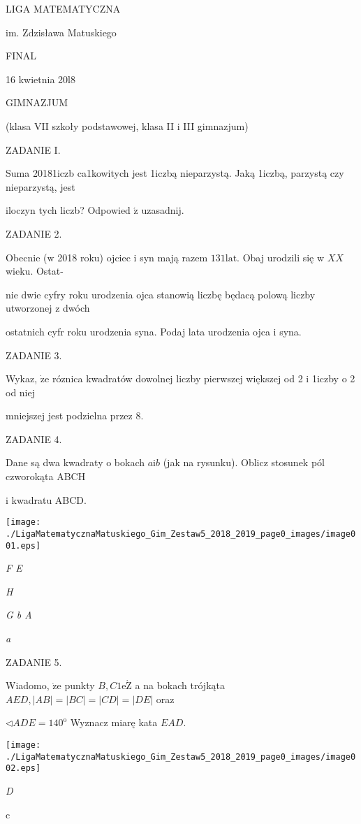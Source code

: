 \documentclass[a4paper,12pt]{article}
\begin{document}
LIGA MATEMATYCZNA

im. Zdzisława Matuskiego

FINAL

16 kwietnia 20l8

GIMNAZJUM

(klasa VII szkoły podstawowej, klasa II i III gimnazjum)

ZADANIE I.

Suma 20181iczb ca1kowitych jest 1iczbą nieparzystą. Jaką 1iczbą, parzystą czy nieparzystą, jest

iloczyn tych liczb? Odpowied $\acute{\mathrm{z}}$ uzasadnij.

ZADANIE 2.

Obecnie ($\mathrm{w}$ 2018 roku) ojciec i syn mają razem $131\mathrm{l}\mathrm{a}\mathrm{t}$. Obaj urodzili się w $XX$ wieku. Ostat-

nie dwie cyfry roku urodzenia ojca stanowią liczbę będacą polową liczby utworzonej z dwóch

ostatnich cyfr roku urodzenia syna. Podaj lata urodzenia ojca i syna.

ZADANIE 3.

Wykaz, $\dot{\mathrm{z}}\mathrm{e}$ róznica kwadratów dowolnej liczby pierwszej większej od 2 i 1iczby o 2 od niej

mniejszej jest podzielna przez 8.

ZADANIE 4.

Dane są dwa kwadraty o bokach $a\mathrm{i}b$ (jak na rysunku). Oblicz stosunek pól czworokąta ABCH

i kwadratu ABCD.
\begin{center}
\texttt{[image: ./LigaMatematycznaMatuskiego\_Gim\_Zestaw5\_2018\_2019\_page0\_images/image001.eps]}
\end{center}
{\it F E}

{\it H}

{\it G  b A}

{\it a}

ZADANIE 5.

Wiadomo, $\dot{\mathrm{z}}\mathrm{e}$ punkty $B, C1\mathrm{e}\dot{\mathrm{Z}}$ a na bokach trójkąta $AED, |AB| = |BC|=|CD|= |DE|$ oraz

$\triangleleft ADE=140^{\mathrm{o}}$ Wyznacz miarę kata $EAD.$
\begin{center}
\texttt{[image: ./LigaMatematycznaMatuskiego\_Gim\_Zestaw5\_2018\_2019\_page0\_images/image002.eps]}
\end{center}
{\it D}

c
\end{document}
